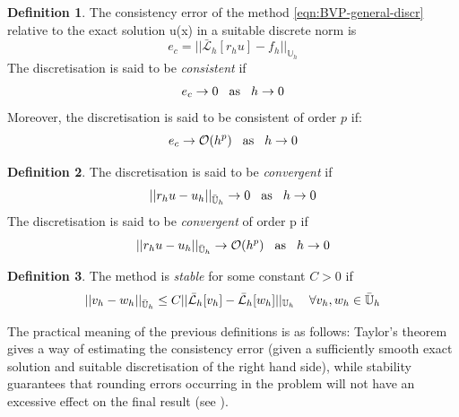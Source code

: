\documentclass[11pt]{article}
\theoremstyle{theorem}
\theoremstyle{definition}
\newtheorem{definition}{Definition}
\begin{document}
\begin{definition}
	\label{defn:consistency}
	The consistency error of the method \eqref{eqn:BVP-general-discr} relative to the exact solution u(x) in a suitable discrete norm is
	$$e_c=||\bar{\mathcal{L}}_h[r_hu]-f_h||_{\mathbb{U}_h} $$
	The discretisation is said to be \emph{consistent} if 
	\begin{equation}
		\label{eqn:consistent}
		e_c\rightarrow 0\hspace{3mm}\text{as}\hspace{3mm}h\rightarrow 0
	\end{equation}
	Moreover, the discretisation is said to be consistent of order $p$ if:
	\begin{equation}
	\label{eqn:consistent-p}
	e_c\rightarrow\mathcal{O}(h^p)\hspace{3mm}\text{as}\hspace{3mm}h\rightarrow 0
	\end{equation}
\end{definition}

\begin{definition}
	The discretisation is said to be \emph{convergent} if 
	\begin{equation}
	\label{eqn:convergent}
	||r_h u-u_h||_{{\bar{\mathbb{U}}}_h}\rightarrow 0\hspace{3mm}\text{as}\hspace{3mm}h\rightarrow 0
	\end{equation}
	The discretisation is said to be \emph{convergent} of order p if 
	\begin{equation}
	\label{eqn:convergent-p}
	||r_h u-u_h||_{{\bar{\mathbb{U}}}_h}\rightarrow \mathcal{O}(h^p)\hspace{3mm}\text{as}\hspace{3mm}h\rightarrow 0
	\end{equation}
\end{definition}

\begin{definition}
	The method is \emph{stable} for some constant $C>0$ if
	\begin{equation}
	\label{eqn:stable}
	||v_h - w_h||_{{\bar{\mathbb{U}}}_h}\le C||\bar{\mathcal{L}}_h[v_h]-\bar{\mathcal{L}}_h[w_h]||_{{{\mathbb{U}}}_h}\hspace{4mm} \forall v_h,w_h\in\bar{\mathbb{U}}_h
	\end{equation}
\end{definition}

The practical meaning of the previous definitions is as follows: Taylor’s theorem gives a way of estimating the consistency error (given a sufficiently smooth exact solution and suitable discretisation of the right hand side), while stability guarantees that rounding errors occurring in the problem will not have an excessive effect on the final result (see \cite{lec-notes}).
\end{document}
